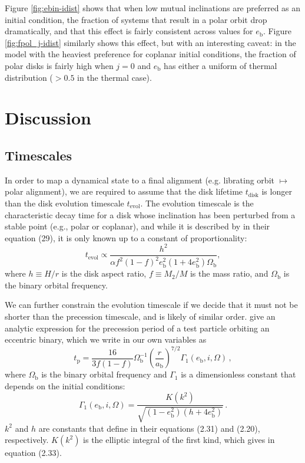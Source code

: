 \documentclass[twocolumn]{aastex631}
\begin{document}
Figure \ref{fig:ebin-idist} shows that when low mutual inclinations are preferred as an initial condition, the fraction of systems that result in a polar orbit drop dramatically, and that this effect is fairly consistent across values for $e_\text{b}$. Figure \ref{fig:fpol_j-idist} similarly shows this effect, but with an interesting caveat: in the model with the heaviest preference for coplanar initial conditions, the fraction of polar disks is fairly high when $j=0$ and $e_\text{b}$ has either a uniform of thermal distribution ($>0.5$ in the thermal case).

\section{Discussion}
\label{sec:discussion}

\subsection{Timescales}
In order to map a dynamical state to a final alignment (e.g. librating orbit $\mapsto$ polar alignment), we are required to assume that the disk lifetime $t_\text{disk}$ is longer than the disk evolution timescale $t_\text{evol}$. The evolution timescale is the characteristic decay time for a disk whose inclination has been perturbed from a stable point (e.g., polar or coplanar), and while it is described by \citet{lubow2018} in their equation (29), it is only known up to a constant of proportionality:
\begin{equation}
    \label{eq:tevol}
    t_\text{evol} \propto \frac{h^2}{\alpha f^2(1-f)^2 e_\text{b}^2(1+4e_\text{b}^2) \Omega_\text{b}} ,
\end{equation}
where $h\equiv H/r$ is the disk aspect ratio, $f\equiv M_2/M$ is the mass ratio, and $\Omega_\text{b}$ is the binary orbital frequency. 

We can further constrain the evolution timescale if we decide that it must not be shorter than the precession timescale, and is likely of similar order. \citet[see eq. (2.32)]{farago2010} give an analytic expression for the precession period of a test particle orbiting an eccentric binary, which we write in our own variables as
\begin{equation}
    t_\text{p} = \frac{16}{3f(1-f)} \Omega_\text{b}^{-1} \left(\frac{r}{a_\text{b}}\right)^{7/2} \Gamma_1(e_\text{b},i,\Omega)\, ,
\end{equation}
where $\Omega_\text{b}$ is the binary orbital frequency and $\Gamma_1$ is a dimensionless constant that depends on the initial conditions:
\begin{equation}
    \Gamma_1(e_\text{b},i,\Omega) = \frac{K(k^2)}{\sqrt{(1-e_\text{b}^2)(h+4e_\text{b}^2)}} \, .
\end{equation}
$k^2$ and $h$ are constants that \citet{farago2010} define in their equations (2.31) and (2.20), respectively. $K(k^2)$ is the elliptic integral of the first kind, which \citet{farago2010} gives in equation (2.33).
\end{document}
